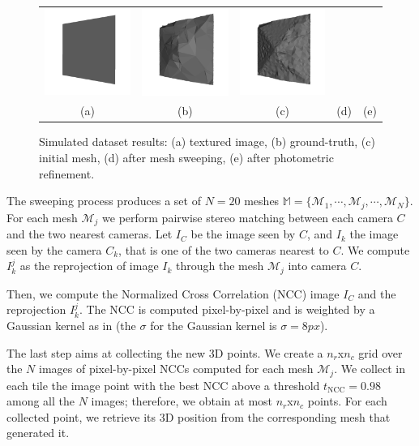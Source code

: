 \begin{figure}[th]
\begin{tabular}{ccccc}
\includegraphics[height=0.18\textwidth]{./img/synth2_init}&
\includegraphics[height=0.18\textwidth]{./img/synth2_after_sweep}&
\includegraphics[height=0.18\textwidth]{./img/synth2_after_photo}\\
(a) &
(b)&
(c) &
(d) &
(e)\\
\end{tabular}
\caption{Simulated dataset results: (a) textured image, (b) ground-truth, (c) initial mesh, (d) after mesh sweeping, (e) after photometric refinement.}
\label{fig:simulated1}
\end{figure}

The sweeping process produces a set of $N = 20$ meshes $\mathbb{M} = \{\mathcal{M}_1, \cdots, \mathcal{M}_j ,\cdots, \mathcal{M}_N\}$.
For each mesh $\mathcal{M}_j$ we perform pairwise stereo matching between each camera $C$ and the two nearest cameras.
Let $I_C$ be the image seen by $C$, and $I_k$ the image seen by the camera $C_k$, that is one of the two cameras nearest to $C$. 
We compute $I_k^j$ as the reprojection of image $I_k$ through the mesh $\mathcal{M}_j$ into camera $C$.


Then, we compute  the Normalized Cross Correlation (NCC) image $I_C$ and the reprojection $I_k^j$. 
The NCC is computed pixel-by-pixel and is weighted by a Gaussian kernel as in \cite{pons2007multi}  (the $\sigma$ for the Gaussian kernel is $\sigma = 8 px$).

The last step aims at collecting the new 3D points. We create a $n_r$x$n_c$ grid over the $N$ images of pixel-by-pixel NCCs computed for each mesh $\mathcal{M}_j$. We collect in each tile the image point with the best NCC above a threshold $t_{\text{NCC}} = 0.98$ among all the $N$ images; therefore, we obtain at most $n_r$x$n_c$ points.
For each collected point, we retrieve its 3D position from the corresponding mesh that generated it.

